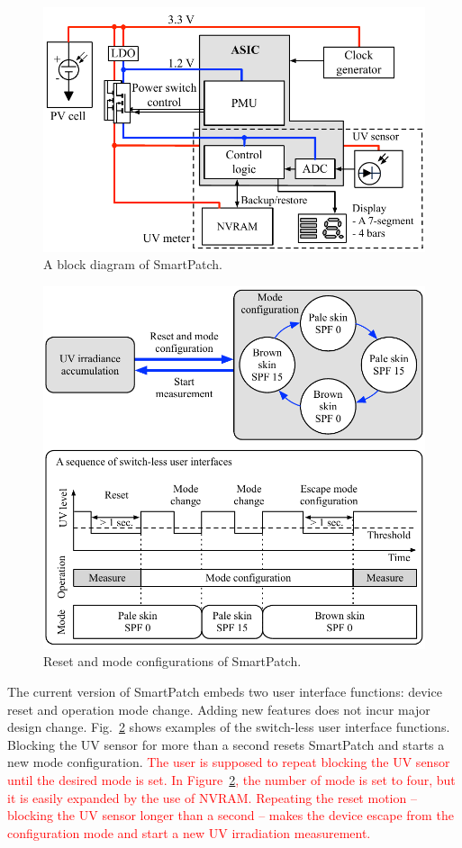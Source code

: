 \documentclass[journal]{IEEEtran}
\begin{document}
\begin{figure}
\centering
\includegraphics[width=1.0\hsize]{Figures/block_diagram.pdf}
\caption{A block diagram of SmartPatch.}
\label{fig:block_diagram}
\end{figure}

\begin{figure}
\centering
\includegraphics[width=1.0\hsize]{Figures/configuration.pdf}
\caption{Reset and mode configurations of SmartPatch.}
\label{fig:configuration}
\end{figure}

The current version of SmartPatch embeds two user interface functions: device reset and operation mode change. Adding new features does not incur major design change. Fig.~\ref{fig:configuration} shows examples of the switch-less user interface functions. Blocking the UV sensor for more than a second resets SmartPatch and starts a new mode configuration. \textcolor{red}{The user is supposed to repeat blocking the UV sensor until the desired  mode is set. In Figure~\ref{fig:configuration}, the number of mode is set to four, but it is easily expanded by the use of NVRAM. Repeating the reset motion -- blocking the UV sensor longer than a second -- makes the device escape from the configuration mode and start a new UV irradiation measurement.}
\end{document}
